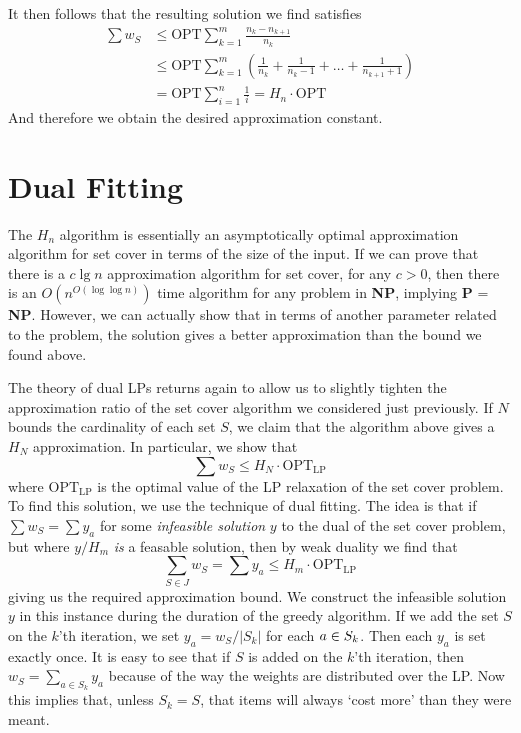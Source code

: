 It then follows that the resulting solution we find satisfies
%
\begin{align*}
    \sum w_S &\leq \text{OPT} \sum_{k = 1}^m \frac{n_k - n_{k+1}}{n_k}\\
    &\leq \text{OPT} \sum_{k = 1}^m \left( \frac{1}{n_k} + \frac{1}{n_k - 1} + \dots + \frac{1}{n_{k+1} + 1} \right)\\
    &= \text{OPT} \sum_{i = 1}^n \frac{1}{i} = H_n \cdot \text{OPT}
\end{align*}
%
And therefore we obtain the desired approximation constant.

\section{Dual Fitting}

The $H_n$ algorithm is essentially an asymptotically optimal approximation algorithm for set cover in terms of the size of the input. If we can prove that there is a $c \lg n$ approximation algorithm for set cover, for any $c > 0$, then there is an $O(n^{O(\log \log n)})$ time algorithm for any problem in {\bf NP}, implying {\bf P} = {\bf NP}. However, we can actually show that in terms of another parameter related to the problem, the solution gives a better approximation than the bound we found above.

The theory of dual LPs returns again to allow us to slightly tighten the approximation ratio of the set cover algorithm we considered just previously. If $N$ bounds the cardinality of each set $S$, we claim that the algorithm above gives a $H_N$ approximation. In particular, we show that
%
\[ \sum w_S \leq H_N \cdot \text{OPT}_{\text{LP}} \]
%
where $\text{OPT}_{\text{LP}}$ is the optimal value of the LP relaxation of the set cover problem. To find this solution, we use the technique of dual fitting. The idea is that if $\sum w_S = \sum y_a$ for some {\it infeasible solution} $y$ to the dual of the set cover problem, but where $y/H_m$ {\it is} a feasable solution, then by weak duality we find that
%
\[ \sum_{S \in J} w_S = \sum y_a \leq H_m \cdot \text{OPT}_{\text{LP}} \]
%
giving us the required approximation bound. We construct the infeasible solution $y$ in this instance during the duration of the greedy algorithm. If we add the set $S$ on the $k$'th iteration, we set $y_a = w_S/|S_k|$ for each $a \in \smash{S_k}$. Then each $y_a$ is set exactly once. It is easy to see that if $S$ is added on the $k$'th iteration, then $w_S = \sum_{a \in S_k} y_a$ because of the way the weights are distributed over the LP. Now this implies that, unless $S_k = S$, that items will always `cost more' than they were meant.

